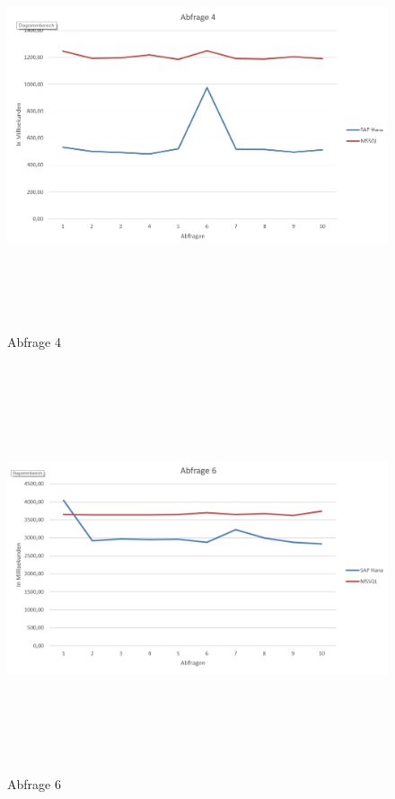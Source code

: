 \documentclass[a4paper, 12pt]{scrartcl}
\begin{document}
\begin{figure}[H]
\centering
\includegraphics[height=12cm, width=15cm, keepaspectratio]{diag3.png}
\caption{Abfrage 4}
\end{figure}  

\begin{figure}[H]
\centering
\includegraphics[height=12cm, width=15cm, keepaspectratio]{diag4.png}
\caption{Abfrage 6}
\end{figure}  
\end{document}

